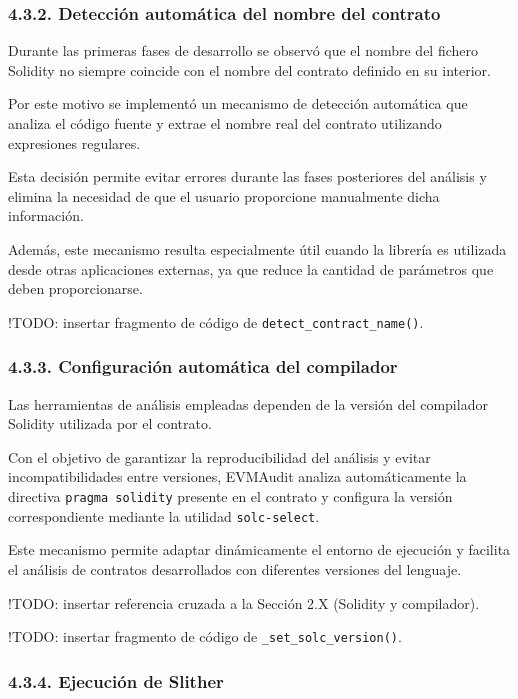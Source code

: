 \subsubsection{4.3.2. Detección automática del nombre del
contrato}\label{detecciuxf3n-automuxe1tica-del-nombre-del-contrato}

Durante las primeras fases de desarrollo se observó que el nombre del
fichero Solidity no siempre coincide con el nombre del contrato definido
en su interior.

Por este motivo se implementó un mecanismo de detección automática que
analiza el código fuente y extrae el nombre real del contrato utilizando
expresiones regulares.

Esta decisión permite evitar errores durante las fases posteriores del
análisis y elimina la necesidad de que el usuario proporcione
manualmente dicha información.

Además, este mecanismo resulta especialmente útil cuando la librería es
utilizada desde otras aplicaciones externas, ya que reduce la cantidad
de parámetros que deben proporcionarse.

!TODO: insertar fragmento de código de
\texttt{detect\_contract\_name()}.

\subsubsection{4.3.3. Configuración automática del
compilador}\label{configuraciuxf3n-automuxe1tica-del-compilador}

Las herramientas de análisis empleadas dependen de la versión del
compilador Solidity utilizada por el contrato.

Con el objetivo de garantizar la reproducibilidad del análisis y evitar
incompatibilidades entre versiones, EVMAudit analiza automáticamente la
directiva \texttt{pragma\ solidity} presente en el contrato y configura
la versión correspondiente mediante la utilidad \texttt{solc-select}.

Este mecanismo permite adaptar dinámicamente el entorno de ejecución y
facilita el análisis de contratos desarrollados con diferentes versiones
del lenguaje.

!TODO: insertar referencia cruzada a la Sección 2.X (Solidity y
compilador).

!TODO: insertar fragmento de código de \texttt{\_set\_solc\_version()}.

\subsubsection{4.3.4. Ejecución de
Slither}\label{ejecuciuxf3n-de-slither}

